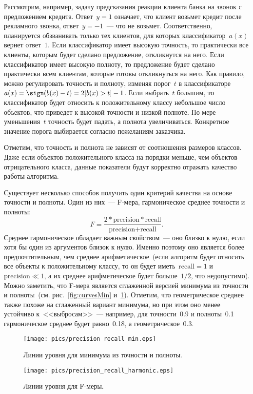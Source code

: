 \documentclass[12pt,fleqn]{article}
\begin{document}
Рассмотрим, например, задачу предсказания реакции клиента банка на звонок с предложением кредита.
Ответ~$y = 1$ означает, что клиент возьмет кредит после рекламного звонка,
ответ~$y = -1$~--- что не возьмет.
Соответственно, планируется обзванивать только тех клиентов, для которых
классификатор~$a(x)$ вернет ответ~$1$.
Если классификатор имеет высокую точность, то практически все клиенты, которым
будет сделано предложение, откликнутся на него.
Если классификатор имеет высокую полноту, то предложение будет сделано практически
всем клиентам, которые готовы откликнуться на него.
Как правило, можно регулировать точность и полноту, изменяя порог~$t$
в классификаторе~$a(x) = \sign(b(x) - t) = 2 [b(x) > t] - 1$.
Если выбрать~$t$ большим, то классификатор будет относить к положительному классу
небольшое число объектов, что приведет к высокой точности и низкой полноте.
По мере уменьшения~$t$ точность будет падать, а полнота увеличиваться.
Конкретное значение порога выбирается согласно пожеланиям заказчика.

Отметим, что точность и полнота не зависят от соотношения размеров классов.
Даже если объектов положительного класса на порядки меньше,
чем объектов отрицательного класса, данные показатели будут корректно
отражать качество работы алгоритма.

Существует несколько способов получить один критерий качества
на основе точности и полноты.
Один из них~--- F-мера, гармоническое среднее точности и полноты:
\[
    F
    =
    \frac{
        2 * \text{precision} * \text{recall}
    }{
        \text{precision} + \text{recall}
    }.
\]
Среднее гармоническое обладает важным свойством~--- оно близко к нулю, если хотя бы
один из аргументов близок к нулю.
Именно поэтому оно является более предпочтительным, чем среднее арифметическое~(если
алгоритм будет относить все объекты к положительному классу,
то он будет иметь~$\text{recall} = 1$ и~$\text{precision} \ll 1$,
а их среднее арифметическое будет больше~$1/2$, что недопустимо).
Можно заметить, что F-мера является сглаженной версией минимума
из точности и полноты~(см. рис.~\ref{fig:curvesMin} и~\ref{fig:curvesHarmonic}).
Отметим, что геометрическое среднее также похоже на сглаженный вариант минимума,
но при этом оно менее устойчиво к~<<выбросам>>~--- например, для точности~0.9
и полноты~0.1 гармоническое среднее будет равно~0.18, а геометрическое~0.3.

\begin{figure}[t]
  \begin{multicols}{2}
    \hfill
    \texttt{[image: pics/precision\_recall\_min.eps]}
    \hfill
    \caption{Линии уровня для минимума из точности и полноты.}
    \label{fig:curvesMin}
    \hfill
    \texttt{[image: pics/precision\_recall\_harmonic.eps]}
    \hfill
    \caption{Линии уровня для F-меры.}
    \label{fig:curvesHarmonic}
  \end{multicols}
\end{figure}
\end{document}

